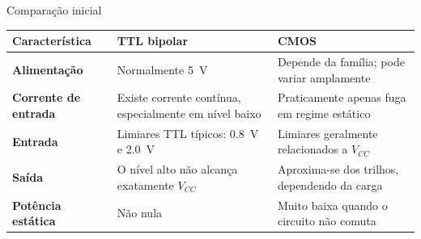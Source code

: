 
\begin{frame}{Comparação inicial}
    \centering
    \small
    \renewcommand{\arraystretch}{1.35}
    \begin{tabular}{>{\bfseries}p{}p{}p{}}
        \toprule
        Característica & TTL bipolar & CMOS \\
        \midrule
        Alimentação & Normalmente 5~V & Depende da família; pode variar amplamente \\
        Corrente de entrada & Existe corrente contínua, especialmente em nível baixo & Praticamente apenas fuga em regime estático \\
        Entrada & Limiares TTL típicos: 0.8~V e 2.0~V & Limiares geralmente relacionados a $V_{CC}$ \\
        Saída & O nível alto não alcança exatamente $V_{CC}$ & Aproxima-se dos trilhos, dependendo da carga \\
        Potência estática & Não nula & Muito baixa quando o circuito não comuta \\
        \bottomrule
    \end{tabular}
\end{frame}